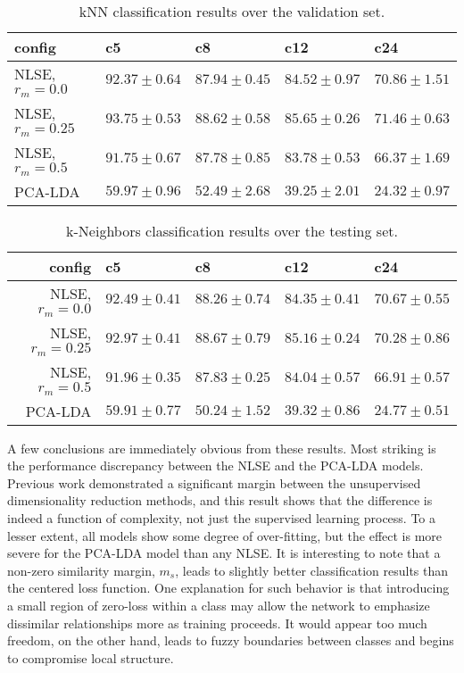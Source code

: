 \begin{table*}[h!]
\begin{center}
\caption{kNN classification results over the validation set.}
\small
\begin{tabular}{lllll}
\hline
config & c5  & c8 & c12   & c24     \\
\hline
 NLSE, $r_{m}=0.0$  & $92.37\pm0.64$ & $87.94\pm0.45$ & $84.52\pm0.97$ & $70.86\pm1.51$ \\
 NLSE, $r_{m}=0.25$ & $93.75\pm0.53$ & $88.62\pm0.58$ & $85.65\pm0.26$ & $71.46\pm0.63$ \\
 NLSE, $r_{m}=0.5$  & $91.75\pm0.67$ & $87.78\pm0.85$ & $83.78\pm0.53$ & $66.37\pm1.69$ \\
 \hline
 PCA-LDA & $59.97\pm0.96$ & $52.49\pm2.68$ & $39.25\pm2.01$ & $24.32\pm0.97$ \\
\hline
\end{tabular}
\label{tab:valid}
\end{center}
\end{table*}

\begin{table*}[h!]
\begin{center}
\caption{k-Neighbors classification results over the testing set.}
\small
\begin{tabular}{rllll}
\hline
config & c5  & c8  & c12   & c24   \\
\hline
 NLSE, $r_{m}=0.0$  & $92.49\pm0.41$ & $88.26\pm0.74$ & $84.35\pm0.41$ & $70.67\pm0.55$ \\
 NLSE, $r_{m}=0.25$ & $92.97\pm0.41$ & $88.67\pm0.79$ & $85.16\pm0.24$ & $70.28\pm0.86$ \\
 NLSE, $r_{m}=0.5$  & $91.96\pm0.35$ & $87.83\pm0.25$ & $84.04\pm0.57$ & $66.91\pm0.57$ \\
 \hline
 PCA-LDA  & $59.91\pm0.77$ & $50.24\pm1.52$ & $39.32\pm0.86$ & $24.77\pm0.51$ \\
\hline
\end{tabular}
\label{tab:test}
\end{center}
\end{table*}


A few conclusions are immediately obvious from these results.
Most striking is the performance discrepancy between the NLSE and the PCA-LDA models.
Previous work demonstrated a significant margin between the unsupervised dimensionality reduction methods, and this result shows that the difference is indeed a function of complexity, not just the supervised learning process.
To a lesser extent, all models show some degree of over-fitting, but the effect is more severe for the PCA-LDA model than any NLSE.
It is interesting to note that a non-zero similarity margin, $m_s$, leads to slightly better classification results than the centered loss function.
One explanation for such behavior is that introducing a small region of zero-loss within a class may allow the network to emphasize dissimilar relationships more as training proceeds.
It would appear too much freedom, on the other hand, leads to fuzzy boundaries between classes and begins to compromise local structure.

